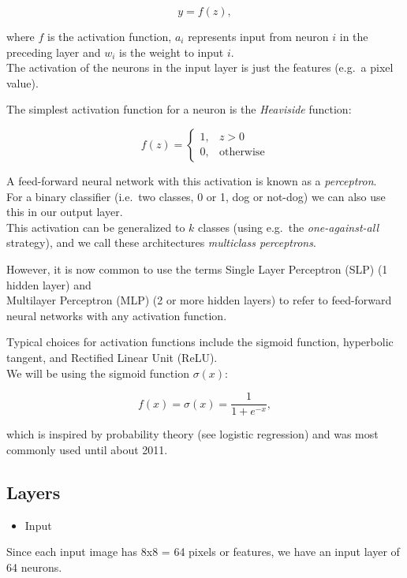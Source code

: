 \documentclass[11pt]{article}
\providecommand{\tightlist}{%
      \setlength{\itemsep}{0pt}\setlength{\parskip}{0pt}}
\begin{document}
\[ y = f(z) ,\]

where \(f\) is the activation function, \(a_i\) represents input from
neuron \(i\) in the preceding layer and \(w_i\) is the weight to input
\(i\).\\
The activation of the neurons in the input layer is just the features
(e.g.~a pixel value).

The simplest activation function for a neuron is the \emph{Heaviside}
function:

\[ f(z) = 
\begin{cases}
1,  &  z > 0\\
0,  & \text{otherwise}
\end{cases}
\]

A feed-forward neural network with this activation is known as a
\emph{perceptron}.\\
For a binary classifier (i.e.~two classes, 0 or 1, dog or not-dog) we
can also use this in our output layer.\\
This activation can be generalized to \(k\) classes (using e.g.~the
\emph{one-against-all} strategy), and we call these architectures
\emph{multiclass perceptrons}.

However, it is now common to use the terms Single Layer Perceptron (SLP)
(1 hidden layer) and\\
Multilayer Perceptron (MLP) (2 or more hidden layers) to refer to
feed-forward neural networks with any activation function.

Typical choices for activation functions include the sigmoid function,
hyperbolic tangent, and Rectified Linear Unit (ReLU).\\
We will be using the sigmoid function \(\sigma(x)\):

\[ f(x) = \sigma(x) = \frac{1}{1 + e^{-x}} ,\]

which is inspired by probability theory (see logistic regression) and
was most commonly used until about 2011.

\hypertarget{layers}{%
\subsection{Layers}\label{layers}}

\begin{itemize}
\tightlist
\item
  Input
\end{itemize}

Since each input image has 8x8 = 64 pixels or features, we have an input
layer of 64 neurons.
\end{document}
